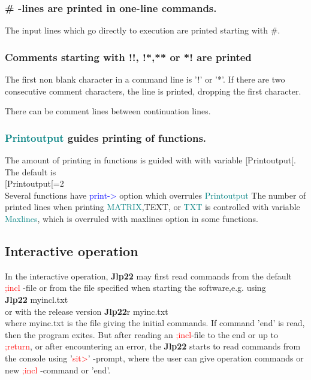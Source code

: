 {\subsubsection{\# -lines are printed in one-line commands.} 
\label{printcommand} 
The input lines which go directly to execution are printed starting with \#. 
\subsubsection{Comments starting with !!, !*,** or *! are printed} 
\label{printcom} 
The first non blank character in a command line is '!' or '*'. 
If there are two consecutive comment characters, the line is printed, dropping the first 
character. 
\begin{note} 
There can be comment lines between continuation lines. 
\end{note} 
\subsubsection{\textcolor{teal}{Printoutput} guides printing of functions.} 
\label{printoutput} 
The amount of printing in functions is guided with with variable [Printoutput[. 
The default is \\ 
[Printoutput[=2\\ 
Several functions have \textcolor{blue}{print->} option which overrules \textcolor{teal}{Printoutput} 
The number of printed lines when printing \textcolor{teal}{MATRIX},TEXT, or \textcolor{teal}{TXT} is controlled with 
variable \textcolor{teal}{Maxlines}, which is overruled with maxlines option in some functions. 
\subsection{Interactive operation} 
\label{interactive} 
In the interactive operation, \textbf{Jlp22} may first read commands from the 
default \textcolor{Red}{;incl} -file or from the file specified when starting the software,e.g. using\\ 
\textbf{Jlp22} myincl.txt \\ 
or with the release version 
\textbf{Jlp22}r myinc.txt\\ 
where myinc.txt is the file giving the initial commands. If command 'end' is read, then the program exites. 
But after reading an \textcolor{Red}{;incl}-file to the end or up to \textcolor{Red}{;return}, or after encountering an error, the \textbf{Jlp22} starts 
to read commands from the console using '\textcolor{Red}{sit>}' -prompt, where the user can give 
operation commands or new \textcolor{Red}{;incl} -command or 'end'. 
 
}

